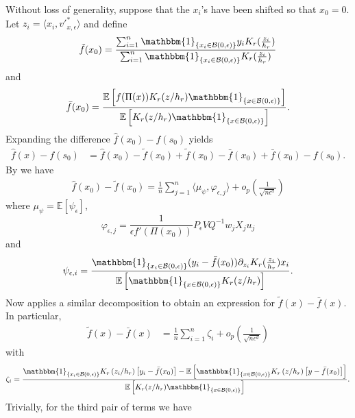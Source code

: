 \documentclass[11pt]{article}
\begin{document}
Without loss of generality, suppose that the $x_i$'s have been shifted so that $x_0 = 0$. Let $z_i = \langle x_i, v'^*_{x, \epsilon}\rangle$ and define
\begin{equation}
\tilde{f}(x_0) = \frac{\sum_{i=1}^n \mathbbm{1}_{\{x_i\in \mathcal{B}(0, \epsilon)\}}y_iK_r(\frac{z_i}{h_r})}{\sum_{i=1}^n \mathbbm{1}_{\{x_i\in \mathcal{B}(0, \epsilon)\}}K_r(\frac{z_i}{h_r})} \label{eq: ftilde}
\end{equation}
and
\begin{equation}\bar{f}(x_0) = \frac{\mathbb{E}\left[f(\Pi(x))K_r(z/h_r)\mathbbm{1}_{\{x\in \mathcal{B}(0, \epsilon)\}}\right]}{\mathbb{E}\left[K_r(z/h_r)\mathbbm{1}_{\{x\in \mathcal{B}(0, \epsilon)\}}\right]}. \label{eq: fbar}
\end{equation}
 Expanding the difference $\hat{f}(x_0) - f(s_0)$ yields
\begin{align}
    \hat{f}(x) - f(s_0) &= \hat{f}(x_0) - \tilde{f}(x_0) + 
    \tilde{f}(x_0) - \bar{f}(x_0) + \bar{f}(x_0) - f(s_0).
\end{align}
By  we have
\begin{align}
    \hat{f}(x_0) - \tilde{f}(x_0) = \frac{1}{n}\sum_{j = 1}^n\langle\mu_{\psi}, \varphi_{\epsilon, j}\rangle + o_p\left(\frac{1}{\sqrt{n\epsilon^d}}\right)
\end{align}
where $\mu_{\psi} = \mathbb{E}[\psi_{\epsilon}]$,  
\[\varphi_{\epsilon, j} = \frac{1}{\epsilon f'(\Pi(x_0))}P_{\epsilon}VQ^{-1}w_jX_ju_j\]
and
\[\psi_{\epsilon, i} = \frac{\mathbbm{1}_{\{x_i \in \mathcal{B}(0, \epsilon)\}}(y_i - \bar{f}(x_0))\partial_{z_i}K_r(\frac{z_i}{h_r})x_i}{\mathbb{E}\left[\mathbbm{1}_{\{x \in \mathcal{B}(0, \epsilon)\}}K_r(z/h_r)\right]}.\]
Now  applies a similar decomposition to obtain an expression for $\tilde{f}(x) - \bar{f}(x)$. In particular,
\begin{align*}
    \tilde{f}(x) - \bar{f}(x) &= \frac{1}{n}\sum_{i = 1}^n\zeta_i + o_p\left(\frac{1}{\sqrt{n\epsilon^{d}}}\right) 
\end{align*}
with 
\begin{equation*}
    \zeta_i = \frac{\mathbbm{1}_{\{x_i \in \mathcal{B}(0, \epsilon)\}}K_r\left(z_i/h_r\right)\left[y_i - \bar{f}(x_0)\right] - \mathbb{E}\left[\mathbbm{1}_{\{x \in \mathcal{B}(0, \epsilon)\}}K_r\left(z/h_r\right)\left[y - \bar{f}(x_0)\right]\right]}{\mathbb{E}\left[K_r(z/h_r)\mathbbm{1}_{\{x\in \mathcal{B}(0, \epsilon)\}}\right]}.
\end{equation*}
Trivially, for the third pair of terms we have
\end{document}

